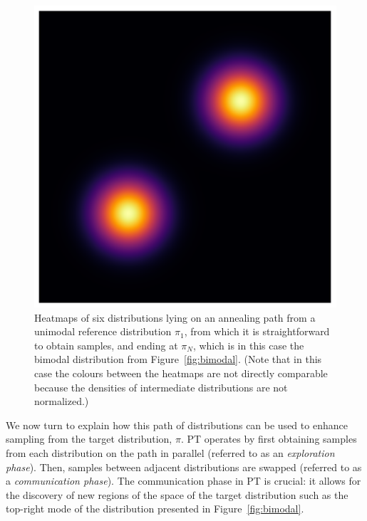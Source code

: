 \begin{figure}[t]
\begin{minipage}{0.15\textwidth}
      \caption*{$\pi_5$}
    \end{minipage}
    \begin{minipage}{0.15\textwidth}
      \centering
      \includegraphics[width=\textwidth]{../img/heatmap_path_6.pdf}
      \caption*{$\pi_6$}
    \end{minipage}
    \caption{Heatmaps of six distributions lying on an annealing path 
    from a unimodal reference distribution  
    $\pi_1$, from which it is straightforward to obtain samples, and ending at 
    $\pi_N$, which is in this case the bimodal distribution from 
    Figure~\ref{fig:bimodal}. (Note that in this case the colours between the heatmaps 
    are not directly comparable because the densities of intermediate distributions 
    are not normalized.)}
    \label{fig:path}
\end{figure}


We now turn to explain how this path of distributions can be used to enhance 
sampling from the target distribution, $\pi$. 
PT operates by first obtaining samples from each distribution on the path in parallel 
(referred to as an \textit{exploration phase}). 
Then, samples between adjacent distributions are swapped (referred to as 
a \textit{communication phase}). The communication phase in PT is crucial: it allows 
for the discovery of new regions of the space of the target distribution such as 
the top-right mode of the distribution presented in Figure~\ref{fig:bimodal}. 


